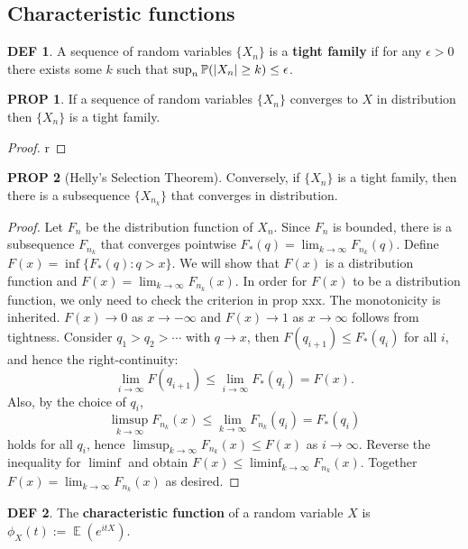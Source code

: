 \documentclass[hidelinks,11pt]{article}
\theoremstyle{definition}
\newtheorem*{defin}{DEF}
\theoremstyle{dotles}
\theoremstyle{dotless}
\newtheorem{prop}{PROP}[section]
\theoremstyle{remark}
\DeclareMathOperator{\E}{\mathbb{E}}
\begin{document}
\bigbreak
\subsection{Characteristic functions}

\begin{defin}
A sequence of random variables $\{X_n\}$ is a \textbf{tight family} if for any $\epsilon>0$ there exists some $k$ such that $\sup_n\mathbb{P}(\abs{X_n}\geq k)\leq\epsilon$.
\end{defin}

\begin{prop}
If a sequence of random variables $\{X_n\}$ converges to $X$ in distribution then $\{X_n\}$ is a tight family.
\end{prop}
\begin{proof}
r
\end{proof}

\begin{prop}[Helly's Selection Theorem]
Conversely, if $\{X_n\}$ is a tight family, then there is a subsequence $\{X_{n_k}\}$ that converges in distribution.
\end{prop}
\begin{proof}
Let $F_n$ be the distribution function of $X_n$. Since $F_n$ is bounded, there is a subsequence $F_{n_k}$ that converges pointwise $F_\ast(q)=\lim_{k\to\infty}F_{n_k}(q)$. Define $F(x)=\inf\{F_\ast(q):q>x\}$. We will show that $F(x)$ is a distribution function and $F(x)=\lim_{k\to\infty}F_{n_k}(x)$.\smallbreak
In order for $F(x)$ to be a distribution function, we only need to check the criterion in prop xxx. The monotonicity is inherited. $F(x)\to0$ as $x\to-\infty$ and $F(x)\to1$ as $x\to\infty$ follows from tightness. Consider $q_1>q_2>\cdots$ with $q\to x$, then $F(q_{i+1})\leq F_\ast(q_i)$ for all $i$, and hence the right-continuity:
\[\lim_{i\to\infty}F(q_{i+1})\leq\lim_{i\to\infty}F_\ast(q_i)=F(x).\]
Also, by the choice of $q_i$,
\[\limsup_{k\to\infty}F_{n_k}(x)\leq\lim_{k\to\infty}F_{n_k}(q_i)=F_\ast(q_i)\]
holds for all $q_i$, hence $\limsup_{k\to\infty}F_{n_k}(x)\leq F(x)$ as $i\to\infty$. Reverse the inequality for $\liminf$ and obtain $F(x)\leq\liminf_{k\to\infty}F_{n_k}(x)$. Together $F(x)=\lim_{k\to\infty}F_{n_k}(x)$ as desired.
\end{proof}

\bigbreak
\begin{defin}
The \textbf{characteristic function} of a random variable $X$ is $\phi_X(t):=\E(e^{itX})$.
\end{defin}
\end{document}
